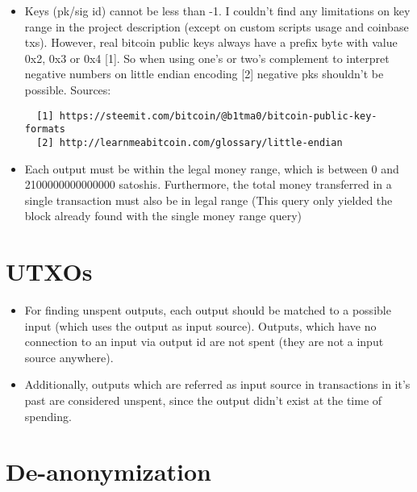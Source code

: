 \documentclass[12pt,a4paper]{article}
\begin{document}
\begin{itemize}
\item Keys (pk/sig id) cannot be less than -1. I couldn't find any limitations on key range in the project description (except on custom scripts usage and coinbase txs).
However, real bitcoin public keys always have a prefix byte with value 0x2, 0x3 or 0x4 [1].
So when using one's or two's complement to interpret negative numbers on little endian encoding [2] negative pks shouldn't be possible.
\newline
Sources:
\begin{verbatim}
  [1] https://steemit.com/bitcoin/@b1tma0/bitcoin-public-key-formats
  [2] http://learnmeabitcoin.com/glossary/little-endian
\end{verbatim}
\item Each output must be within the legal money range, which is between 0 and 2100000000000000 satoshis.\newline
Furthermore, the total money transferred in a single transaction must also be in legal range (This query only yielded the block already found with the single money range query)\newline
\end{itemize}

\section{UTXOs}
\begin{itemize}
\item For finding unspent outputs, each output should be matched to a possible input (which uses the output as input source).
Outputs, which have no connection to an input via output id are not spent (they are not a input source anywhere).
\item Additionally, outputs which are referred as input source in transactions in it's past are considered unspent,
since the output didn't exist at the time of spending.
\end{itemize}
\section{De-anonymization}
\end{document}
